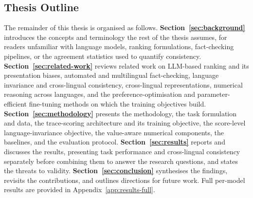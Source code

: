 \subsection{Thesis Outline}
\label{sec:outline}

The remainder of this thesis is organised as follows.
\textbf{Section~\ref{sec:background}} introduces the concepts and terminology the rest of the thesis
assumes, for readers unfamiliar with language models, ranking formulations, fact-checking pipelines,
or the agreement statistics used to quantify consistency.
\textbf{Section~\ref{sec:related-work}} reviews related work on LLM-based ranking and its presentation
biases, automated and multilingual fact-checking, language invariance and cross-lingual consistency,
cross-lingual representations, numerical reasoning across languages, and the preference-optimisation
and parameter-efficient fine-tuning methods on which the training objectives build.
\textbf{Section~\ref{sec:methodology}} presents the methodology, the task formulation and data,
the trace-scoring architecture and its training objective, the score-level language-invariance
objective, the value-aware numerical components, the baselines, and the evaluation protocol.
\textbf{Section~\ref{sec:results}} reports and discusses the results, presenting task performance and
cross-lingual consistency separately before combining them to answer the research questions, and
states the threats to validity.
\textbf{Section~\ref{sec:conclusion}} synthesises the findings, revisits the contributions, and
outlines directions for future work.
Full per-model results are provided in Appendix~\ref{app:results-full}.
